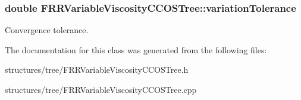 \subsubsection[{\texorpdfstring{variation\+Tolerance}{variationTolerance}}]{\setlength{\rightskip}{0pt plus 5cm}double F\+R\+R\+Variable\+Viscosity\+C\+C\+O\+S\+Tree\+::variation\+Tolerance\hspace{0.3cm}{\ttfamily [private]}}\hypertarget{class_f_r_r_variable_viscosity_c_c_o_s_tree_a8cea4a5abcffd37cb053fce38cee03cf}{}\label{class_f_r_r_variable_viscosity_c_c_o_s_tree_a8cea4a5abcffd37cb053fce38cee03cf}
Convergence tolerance. 

The documentation for this class was generated from the following files\+:\begin{DoxyCompactItemize}
\item 
structures/tree/F\+R\+R\+Variable\+Viscosity\+C\+C\+O\+S\+Tree.\+h\item 
structures/tree/F\+R\+R\+Variable\+Viscosity\+C\+C\+O\+S\+Tree.\+cpp\end{DoxyCompactItemize}
